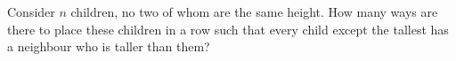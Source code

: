 Consider $n$ children, no two of whom are the same height.
How many ways are there to place these children in a row such that every
child except the tallest has a neighbour who is taller than them?